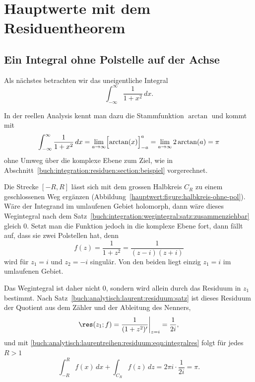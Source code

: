 %
%
%
\section{Hauptwerte mit dem Residuentheorem
\label{hauptwert:section:hauptwerte-residuen}}


\subsection{Ein Integral ohne Polstelle auf der Achse
\label{hauptwert:subsection:aufwaermbeispiel}}


Als nächstes betrachten wir das uneigentliche Integral
\begin{equation}
  \int_{-\infty}^{\infty} \frac{1}{1 + x^2}\,dx.
\end{equation}

In der reellen Analysis kennt man dazu die Stammfunktion $\arctan$ und
kommt mit
\begin{equation}
  \int_{-\infty}^{\infty} \frac{1}{1 + x^2}\,dx
  =
  \lim_{a\to\infty}
  \Bigl[
    \arctan(x)
  \Bigr]_{-a}^{a}
  =
  \lim_{a\to\infty} 2\arctan(a)
  =
  \pi
  \label{hauptwert:equation:arctan}
\end{equation}
ohne Umweg über die komplexe Ebene zum Ziel, wie in
Abschnitt~\ref{buch:integration:residuen:section:beispiel} vorgerechnet.

Die Strecke $[-R,R]$ lässt sich mit dem grossen Halbkreis $C_R$ zu einem
geschlossenen Weg ergänzen
(Abbildung~\ref{hauptwert:figure:halbkreis-ohne-pol}).
Wäre der Integrand im umlaufenen Gebiet holomorph, dann wäre dieses
Wegintegral nach dem
Satz~\ref{buch:integration:wegintegral:satz:zusammenziehbar} gleich $0$.
Setzt man die Funktion jedoch in die komplexe Ebene fort, dann fällt auf,
dass sie zwei Polstellen hat, denn
\begin{equation}
  f(z)
  =
  \frac{1}{1 + z^2}
  =
  \frac{1}{(z - i)(z + i)}
  \label{hauptwert:equation:faktorisierung}
\end{equation}
wird für $z_1 = i$ und $z_2 = -i$ singulär.
Von den beiden liegt einzig $z_1 = i$ im umlaufenen Gebiet.

Das Wegintegral ist daher nicht $0$, sondern wird allein durch das Residuum
in $z_1$ bestimmt.
Nach Satz~\ref{buch:analytisch:laurent:residuum:satz} ist dieses Residuum
der Quotient aus dem Zähler und der Ableitung des Nenners,
\begin{equation}
  \res(z_1;f)
  =
  \biggl.\frac{1}{(1 + z^2)'}\biggr|_{z = i}
  =
  \frac{1}{2i},
  \label{hauptwert:equation:residuum-i}
\end{equation}
und mit \eqref{buch:analytisch:laurentreihen:residuum:eqn:integralres}
folgt für jedes $R > 1$
\begin{equation}
  \int_{-R}^{R} f(x)\,dx
  +
  \int_{C_R} f(z)\,dz
  =
  2\pi i \cdot \frac{1}{2i}
  =
  \pi.
  \label{hauptwert:equation:aufwaermkontur}
\end{equation}


